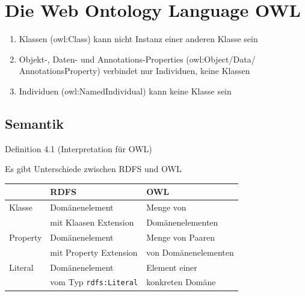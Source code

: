 \documentclass[a4paper]{article}
\title{\docTitle}
\author{Moritz}
\date{\today}
\begin{document}
\maketitle
\tableofcontents


\section{Die Web Ontology Language OWL}


\begin{enumerate}
    \item Klassen (owl:Class) kann nicht Instanz einer anderen Klasse sein
    \item Objekt-, Daten- und Annotations-Properties (owl:Object/Data/ AnnotationsProperty) verbindet nur Individuen, keine Klassen
    \item Individuen (owl:NamedIndividual) kann keine Klasse sein
\end{enumerate}

\subsection{Semantik}

Definition 4.1 (Interpretation für OWL)

Es gibt Unterschiede zwischen RDFS und OWL

\begin{center}
    \begin{tabular}{l|ll}
        & RDFS & OWL \\
        \hline
        Klasse & Domänenelement 
        & Menge von \\
        & mit Klaasen Extension 
        & Domänenelementen \\
        \hline
        Property & Domänenelement 
        & Menge von Paaren \\
        & mit Property Extension 
        & von Domänenelementen \\
        \hline
        Literal & Domänenelement
        & Element einer \\
        & vom Typ \lstinline|rdfs:Literal| 
        & konkreten Domäne \\
    \end{tabular}
\end{center}
\end{document}
